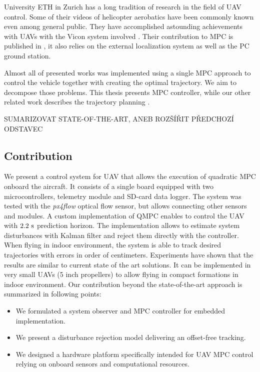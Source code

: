 University ETH in Zurich has a long tradition of research in the field of UAV control. Some of their videos of helicopter aerobatics have been commonly known even among general public. They have accomplished astounding achievements with UAVs with the Vicon system involved \citep{brescianini2013polearobatics, Augugliaro2013buildingstructures}. Their contribution to MPC is published in \citep{ethMueller2013mpc}, it also relies on the external localization system as well as the PC ground station.

Almost all of presented works was implemented using a single MPC approach to control the vehicle together with creating the optimal trajectory. We aim to decompose those problems. This thesis presents MPC controller, while our other related work describes the trajectory planning \citep{saska_baca2014, saska2014formations}.

SUMARIZOVAT STATE-OF-THE-ART, ANEB ROZŠÍŘIT PŘEDCHOZÍ ODSTAVEC

\subsection{Contribution}

We present a control system for UAV that allows the execution of quadratic MPC onboard the aircraft. It consists of a single board equipped with two microcontrollers, telemetry module and SD-card data logger. The system was tested with the \textit{px4flow} optical flow sensor, but allows connecting other sensors and modules. A custom implementation of QMPC enables to control the UAV with $2.2~\mathrm{s}$ prediction horizon. The implementation allows to estimate system disturbances with Kalman filter and reject them directly with the controller. When flying in indoor environment, the system is able to track desired trajectories with errors in order of centimeters. Experiments have shown that the results are similar to current state of the art solutions. It can be implemented in very small UAVs (5 inch propellers) to allow flying in compact formations in indoor environment. Our contribution beyond the state-of-the-art approach is summarized in following points:

\begin{itemize}
\item We formulated a system observer and MPC controller for embedded implementation.
\item We present a disturbance rejection model delivering an offset-free tracking.
\item We designed a hardware platform specifically intended for UAV MPC control relying on onboard sensors and computational resources.
\end{itemize}

